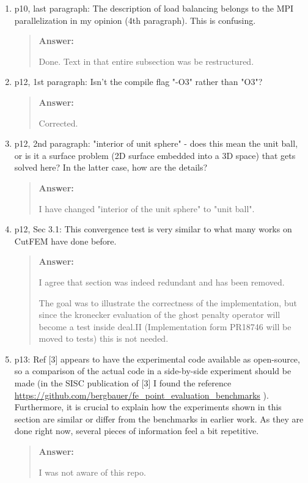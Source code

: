 \documentclass[11pt, a4paper]{article}
\newenvironment{answer}{%
      \begin{quote}%
            \color{blue!80!black}%
            \textbf{Answer:}%
            }{%
      \end{quote}%
}
\begin{document}
\begin{enumerate}[label=\textbullet, wide, labelindent=0pt]
      \item p10, last paragraph: The description of load balancing belongs to the MPI parallelization in my opinion
            (4th paragraph). This is confusing.
            \begin{answer}
                  Done. Text in that entire subsection was be restructured.
            \end{answer}

      \item p12, 1st paragraph: Isn't the compile flag "-O3" rather than "O3"?
            \begin{answer}
                  Corrected.
            \end{answer}

      \item p12, 2nd paragraph: "interior of unit sphere" - does this mean the unit ball, or is it a surface problem
            (2D surface embedded into a 3D space) that gets solved here? In the latter case, how are the details?
            \begin{answer}
                  I have changed "interior of the unit sphere" to "unit ball".
            \end{answer}

      \item p12, Sec 3.1: This convergence test is very similar to what many works on CutFEM have done before.
            \begin{answer}
                  I agree that section was indeed redundant and has been removed.

                  The goal was to illustrate the correctness of the implementation, but since the kronecker evaluation
                  of the ghost penalty operator will become a test inside deal.II (Implementation form PR18746 will be
                  moved to tests) this is not needed.
            \end{answer}

      \item p13: Ref [3] appears to have the experimental code available as open-source, so a comparison of the
            actual code in a side-by-side experiment should be made (in the SISC publication of [3] I found the
            reference
            \url{https://github.com/bergbauer/fe_point_evaluation_benchmarks} ). Furthermore, it is crucial to explain
            how the
            experiments shown in this section are similar or differ from the benchmarks in earlier work. As they are
            done
            right
            now, several pieces of information feel a bit repetitive.
            \begin{answer}
                  I was not aware of this repo.


\end{answer}
\end{enumerate}
\end{document}
